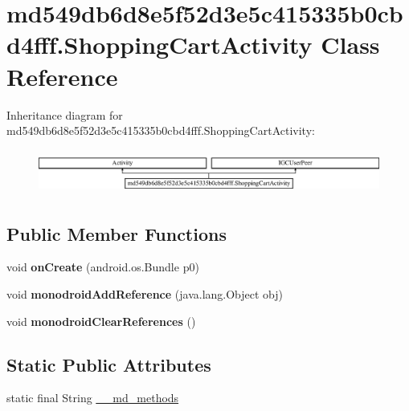 \hypertarget{classmd549db6d8e5f52d3e5c415335b0cbd4fff_1_1_shopping_cart_activity}{}\section{md549db6d8e5f52d3e5c415335b0cbd4fff.\+Shopping\+Cart\+Activity Class Reference}
\label{classmd549db6d8e5f52d3e5c415335b0cbd4fff_1_1_shopping_cart_activity}
Inheritance diagram for md549db6d8e5f52d3e5c415335b0cbd4fff.\+Shopping\+Cart\+Activity\+:\begin{figure}[H]
\begin{center}
\leavevmode
\includegraphics[height=1.481482cm]{classmd549db6d8e5f52d3e5c415335b0cbd4fff_1_1_shopping_cart_activity}
\end{center}
\end{figure}
\subsection*{Public Member Functions}
\begin{DoxyCompactItemize}
\item 
\mbox{\label{classmd549db6d8e5f52d3e5c415335b0cbd4fff_1_1_shopping_cart_activity_aef0ff5e63eec1c61901e153c807683ff}} 
void {\bfseries on\+Create} (android.\+os.\+Bundle p0)
\item 
\mbox{\label{classmd549db6d8e5f52d3e5c415335b0cbd4fff_1_1_shopping_cart_activity_af3ae551cce136e209ecd0afd7d23ccdc}} 
void {\bfseries monodroid\+Add\+Reference} (java.\+lang.\+Object obj)
\item 
\mbox{\label{classmd549db6d8e5f52d3e5c415335b0cbd4fff_1_1_shopping_cart_activity_a7880bd0b71a320c05e92f7e69f17a7c2}} 
void {\bfseries monodroid\+Clear\+References} ()
\end{DoxyCompactItemize}
\subsection*{Static Public Attributes}
\begin{DoxyCompactItemize}
\item 
static final String \hyperlink{classmd549db6d8e5f52d3e5c415335b0cbd4fff_1_1_shopping_cart_activity_a5fa40bbcc99c172a57445a1f47379e6b}{\+\_\+\+\_\+md\+\_\+methods}
\end{DoxyCompactItemize}


